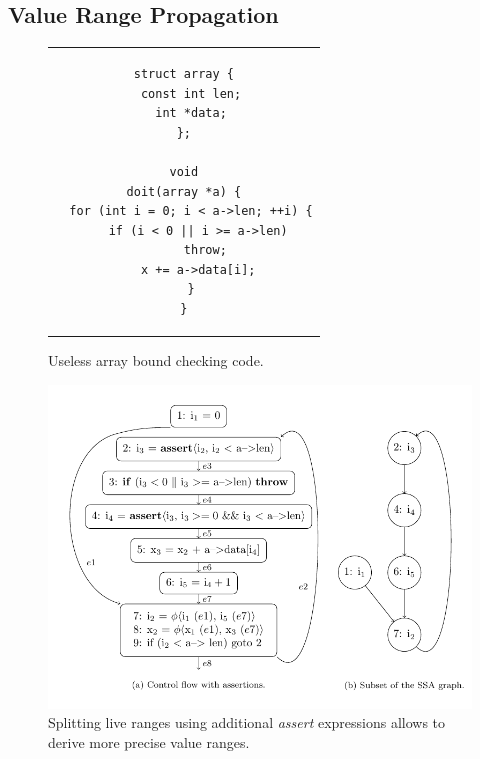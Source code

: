 \subsection{Value Range Propagation}
\label{novillo:sec:vrp}

\begin{figure}[b!]
  \begin{center}
    \begin{tabular}{c}
      \begin{lstlisting}
struct array {
  const int len;
  int *data;
};

void
doit(array *a) {
  for (int i = 0; i < a->len; ++i) {
    if (i < 0 || i >= a->len)
      throw;
    x += a->data[i];
  }
}
      \end{lstlisting}
    \end{tabular}
  \end{center}
  \caption{Useless array bound checking code.}
  \label{novillo:fig:vrp-1}
\end{figure}

\begin{figure}[t!]
  \vspace{-1em}
  \begin{center}
    \includegraphics{value_range_propagation}
  \end{center}
  \vspace{-2em}
  \caption{Splitting live ranges using additional \emph{assert} expressions
           allows to derive more precise value ranges.}
  \subfloat{\label{novillo:fig:vrp-2:a}}
  \subfloat{\label{novillo:fig:vrp-2:b}}
  \label{novillo:fig:vrp-2}
\end{figure}

